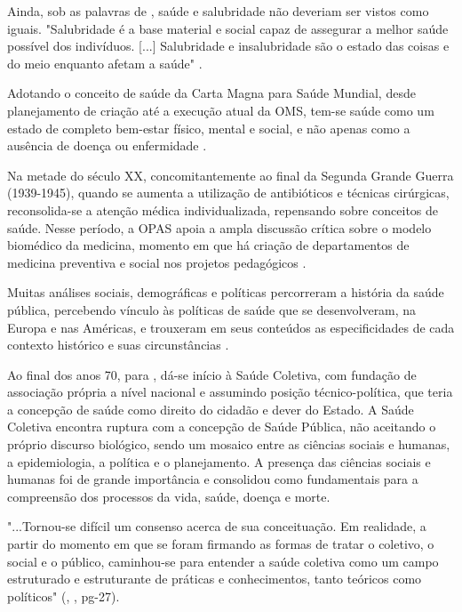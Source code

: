 \indent Ainda, sob as palavras de , saúde e salubridade não deveriam ser vistos como iguais. "Salubridade é a base material e social capaz de assegurar a melhor saúde possível dos indivíduos. [...] Salubridade e insalubridade são o estado das coisas e do meio enquanto afetam a saúde"  \cite{Foucault1990Microfisica}.

\indent Adotando o conceito de saúde da Carta Magna para Saúde Mundial, desde planejamento de criação até a execução atual da \acrfull{OMS}, tem-se saúde como um estado de completo bem-estar físico, mental e social, e não apenas como a ausência de doença ou enfermidade \cite{OMS2024S1, ParranHEALTH}.

\indent  Na metade do século XX, concomitantemente ao final da Segunda Grande Guerra (1939-1945), quando se aumenta a utilização de antibióticos e técnicas cirúrgicas, reconsolida-se a atenção médica individualizada, repensando sobre conceitos de saúde. Nesse período, a \acrfull{OPAS} apoia a ampla discussão crítica sobre o modelo biomédico da medicina, momento em que há criação de departamentos de medicina preventiva e social nos projetos pedagógicos \cite{TratadoSaudeColetiva}.

\indent Muitas análises sociais, demográficas e políticas percorreram a história da saúde pública, percebendo vínculo às políticas de saúde que se desenvolveram, na Europa e nas Américas, e trouxeram em seus conteúdos as especificidades de cada contexto histórico e suas circunstâncias \cite{TratadoSaudeColetiva}.

\indent Ao final dos anos 70, para , dá-se início à Saúde Coletiva, com fundação de associação própria a nível nacional e assumindo posição técnico-política, que teria a concepção de saúde como direito do cidadão e dever do Estado. A Saúde Coletiva encontra ruptura com a concepção de Saúde Pública, não aceitando o próprio discurso biológico, sendo um mosaico entre as ciências sociais e humanas, a epidemiologia, a política e o planejamento. A presença das ciências sociais e humanas foi de grande importância e consolidou como fundamentais para a compreensão dos processos da vida, saúde, doença e morte.

\begin{citacao}
\indent "...Tornou-se difícil um consenso acerca de sua conceituação. Em realidade, a partir do momento em que se foram firmando as formas de tratar o coletivo, o social e o público, caminhou-se para entender a saúde coletiva como um campo estruturado e estruturante de práticas e conhecimentos, tanto teóricos como políticos" (\citeauthor{TratadoSaudeColetiva}, \citeyear{TratadoSaudeColetiva}, pg-27).
\end{citacao}


